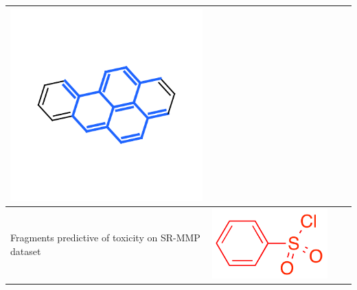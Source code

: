 \documentclass[landscape,a0b,final,a4resizeable]{include/a0poster}
\begin{document}
\begin{poster}
\begin{multicols}{3}
\begin{center}
\begin{tabular}{>{\centering}m{\mywidthb} >{\centering}m{\mywidtha} >{\centering}m{\mywidtha} >{\centering\arraybackslash}m{\mywidtha}}
\includegraphics[width=\mywidtha, clip, trim = 2mm 3mm 2mm 6mm]{figures/fig_10.pdf} \\
\midrule
\vspace{0.5in}Fragments predictive of toxicity on SR-MMP dataset\vspace{0.5in}
& \includegraphics[width=7cm]{figures/jorge-figures/7.png} 

\end{tabular}
\end{center}
\end{multicols}
\end{poster}
\end{document}
